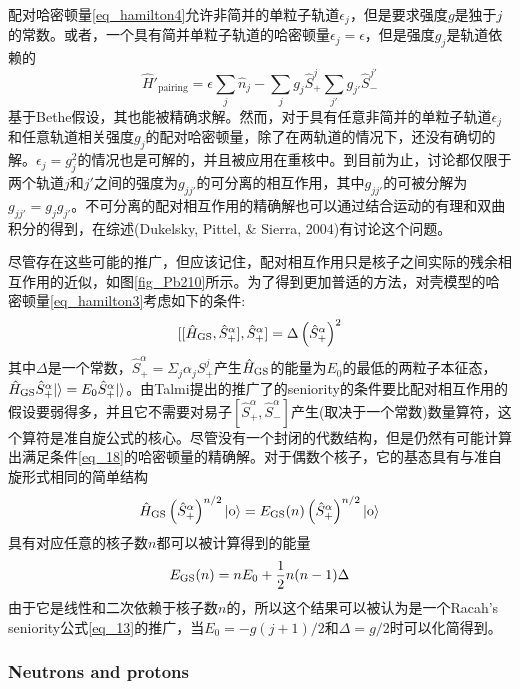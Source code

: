 配对哈密顿量\ref{eq_hamilton4}允许非简并的单粒子轨道$\epsilon_j$，但是要求强度$g$是独于$j$的常数。或者，一个具有简并单粒子轨道的哈密顿量$\epsilon_j=\epsilon$，但是强度$g_j$是轨道依赖的
\begin{equation}
\hat{H}'_\textrm{pairing}=\epsilon\sum_j\hat{n}_j-\sum_jg_j\hat{S}^j_+\sum_{j'}g_{j'}\hat{S}^{j'}_-
\end{equation}
基于Bethe假设，其也能被精确求解。然而，对于具有任意非简并的单粒子轨道$\epsilon_j$和任意轨道相关强度$g_j$的配对哈密顿量，除了在两轨道的情况下，还没有确切的解。$\epsilon_j=g_j^2$的情况也是可解的，并且被应用在重核中。到目前为止，讨论都仅限于两个轨道$j$和$j'$之间的强度为$g_{jj'}$的可分离的相互作用，其中$g_{jj'}$的可被分解为$g_{jj'}=g_jg_{j'}$。不可分离的配对相互作用的精确解也可以通过结合运动的有理和双曲积分的得到，在综述(Dukelsky, Pittel, \& Sierra, 2004)有讨论这个问题。

尽管存在这些可能的推广，但应该记住，配对相互作用只是核子之间实际的残余相互作用的近似，如图\ref{fig_Pb210}所示。为了得到更加普适的方法，对壳模型的哈密顿量\ref{eq_hamilton3}考虑如下的条件:
\begin{equation}\label{eq_18}
[[\hat{H}_{\rm GS},\hat{S}_+^\alpha],\hat{S}_+^\alpha]=\Delta\left(\hat{S}^\alpha_+\right)^2
\end{equation}
其中$\Delta$是一个常数，$\hat{S}_+^\alpha=\Sigma_j\alpha_j S_+^j$产生$\hat{H}_{\rm GS}$的能量为$E_0$的最低的两粒子本征态，$\hat{H}_{\rm GS}\hat{S}_+^\alpha|{\rm}\rangle=E_0\hat{S}_+^\alpha|{\rm}\rangle$。由Talmi提出的推广了的seniority的条件要比配对相互作用的假设要弱得多，并且它不需要对易子$[\hat{S}_+^\alpha,\hat{S}_-^\alpha]$产生(取决于一个常数)数量算符，这个算符是准自旋公式的核心。尽管没有一个封闭的代数结构，但是仍然有可能计算出满足条件\ref{eq_18}的哈密顿量的精确解。对于偶数个核子，它的基态具有与准自旋形式相同的简单结构
\begin{equation*}
\hat{H}_{\rm GS}\left(\hat{S}_+^\alpha\right)^{n/2}|{\rm o}\rangle=E_{\rm GS}(n)\left(\hat{S}_+^\alpha\right)^{n/2}|{\rm o}\rangle
\end{equation*}
具有对应任意的核子数$n$都可以被计算得到的能量
\begin{equation*}
E_{\rm GS}(n)=nE_0+\frac{1}{2}n(n-1)\Delta
\end{equation*}
由于它是线性和二次依赖于核子数$n$的，所以这个结果可以被认为是一个Racah's seniority公式\ref{eq_13}的推广，当$E_0=-g(j+1)/2$和$\Delta=g/2$时可以化简得到。

\subsubsection{Neutrons and protons}

